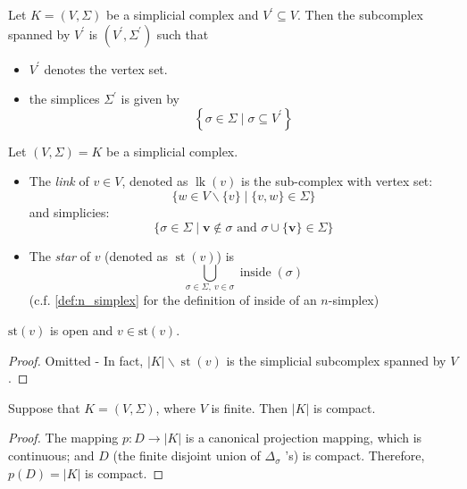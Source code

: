 \begin{definition} Let \(K = \left( {V,\Sigma }\right)\) be a simplicial complex and \({V}^{\prime } \subseteq  V\). Then the subcomplex spanned by \({V}^{\prime }\) is \(\left( {{V}^{\prime },{\Sigma }^{\prime }}\right)\) such that
\begin{itemize}
\item \({V}^{\prime }\) denotes the vertex set.
\item the simplices \({\Sigma }^{\prime }\) is given by
\[
\left\{  {\sigma  \in  \Sigma  \mid  \sigma  \subseteq  {V}^{\prime }}\right\}
\]
\end{itemize}
\end{definition}

\begin{definition}  \label{def:link_star} Let \(\left( {V,\Sigma }\right)  = K\) be a simplicial complex.
\begin{itemize}
\item The \emph{link} of \(v \in  V\), denoted as \(\operatorname{lk}\left( v\right)\) is the sub-complex with vertex set:
\[
\{ w \in  V \smallsetminus  \{ v\}  \mid  \{ v,w\}  \in  \Sigma \}
\]
and simplicies:
\[
\{ \sigma  \in  \Sigma  \mid  \mathbf{v} \notin  \sigma \text{ and }\sigma  \cup  \{ \mathbf{v}\}  \in  \Sigma \}
\]
\item The \emph{star} of \(v\) (denoted as \(\operatorname{st}\left( v\right)\)) is
\[
\bigcup_{\sigma  \in  \Sigma,\ v \in  \sigma} \operatorname{inside}\left( \sigma \right)
\]
(c.f. \autoref{def:n_simplex} for the definition of inside of an $n$-simplex)
\end{itemize}
\end{definition}

\begin{proposition} \(\mathrm{{st}}\left( v\right)\) is open and \(v \in  \mathrm{{st}}\left( v\right)\).
\end{proposition}
\begin{proof} Omitted - In fact, \(\left| K\right|  \smallsetminus  \operatorname{st}\left( v\right)\) is the simplicial subcomplex spanned by \(V\).
\end{proof}

\begin{proposition} Suppose that \(K = \left( {V,\Sigma }\right)\), where \(V\) is finite. Then \(\left| K\right|\) is compact.
\end{proposition}
\begin{proof} The mapping \(p: D \rightarrow  \left| K\right|\) is a canonical projection mapping, which is continuous; and \(D\) (the finite disjoint union of \({\Delta }_{\sigma }\) ’s) is compact. Therefore, \(p\left( D\right)  = \left| K\right|\) is compact.
\end{proof}

